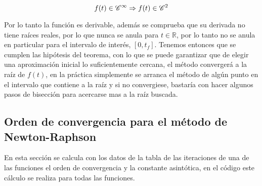 \[
f(t) \in {\rm{ }}\mathscr{C}^{\infty} \Rightarrow f(t) \in {\rm{ }}\mathscr{C}^{2}
\]

Por lo tanto la función es derivable, además se comprueba que su derivada no tiene raíces reales, por lo que nunca se anula para $t \in \mathbb{R}$, por lo tanto no se anula en particular para el intervalo de interés, $[0, t_{f}]$. Tenemos entonces que se cumplen las hipótesis del teorema, con lo que se puede garantizar que de elegir una aproximación inicial lo suficientemente cercana, el método convergerá a la raíz de $f(t)$, en la práctica simplemente se arranca el método de algún punto en el intervalo que contiene a la raíz y si no convergiese, bastaría con hacer algunos pasos de bisección para acercarse mas a la raíz buscada.


\clearpage

\subsection{Orden de convergencia para el método de Newton-Raphson }

En esta sección se calcula con los datos de la tabla de las iteraciones de una de las funciones el orden de convergencia y la constante asintótica, en el código este cálculo se realiza para todas las funciones.



\edef\iterationscount{\DTLrowcount{extraresultsnrdb}}

\edef\iterl{\iterationscount}
\edef\iterlp{\intcalcDec{\iterl}}
\edef\iterlpp{\intcalcDec{\iterlp}}
\edef\iterlppp{\intcalcDec{\iterlpp}}




